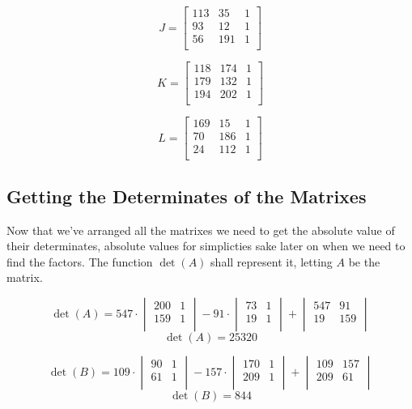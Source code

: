 \documentclass[12pft, english]{article}
\begin{document}
\begin{multicols}{2}
  \[
    J =
    \begin{bmatrix}
      113 & 35  & 1 \\
      93  & 12  & 1 \\
      56  & 191 & 1\\
    \end{bmatrix}
  \]

  \[
    K =
    \begin{bmatrix}
      118 & 174 & 1 \\
      179 & 132 & 1 \\
      194 & 202 & 1\\
    \end{bmatrix}
  \]

  \[
    L =
    \begin{bmatrix}
      169 & 15  & 1 \\
      70  & 186 & 1 \\
      24  & 112 & 1\\
    \end{bmatrix}
  \]

  \subsection{Getting the Determinates of the Matrixes}
  Now that we've arranged all the matrixes we need to get the absolute value of their determinates, absolute values for simplicties sake later on when we need to find the factors. The function \(\det(A)\) shall represent it, letting \(A\) be the matrix.

  \[
    \det(A) =
    547 \cdot
    \begin{vmatrix}
      200 & 1 \\
      159 & 1 \\
    \end{vmatrix}
    -
    91 \cdot
    \begin{vmatrix}
      73 & 1 \\
      19 & 1 \\
    \end{vmatrix}
    +
    \begin{vmatrix}
      547 & 91 \\
      19 & 159 \\
    \end{vmatrix}
  \]
  \[
    \det(A) = 25320
  \]

  \[
    \det(B) =
    109 \cdot
    \begin{vmatrix}
      90 & 1 \\
      61 & 1 \\
    \end{vmatrix}
    -
    157 \cdot
    \begin{vmatrix}
      170 & 1 \\
      209 & 1 \\
    \end{vmatrix}
    +
    \begin{vmatrix}
      109 & 157 \\
      209 & 61 \\
    \end{vmatrix}
  \]
  \[
    \det(B) = 844
  \]


\end{multicols}
\end{document}
